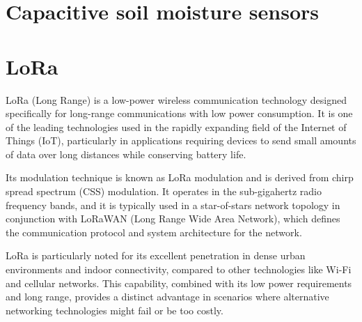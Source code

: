 \section{Capacitive soil moisture sensors}



\section{LoRa}
LoRa (Long Range) is a low-power wireless communication technology designed specifically for long-range communications with low power consumption. It is one of the leading technologies used in the rapidly expanding field of the Internet of Things (IoT), particularly in applications requiring devices to send small amounts of data over long distances while conserving battery life.

Its modulation technique is known as LoRa modulation and is derived from chirp spread spectrum (CSS) modulation. It operates in the sub-gigahertz radio frequency bands, and it is typically used in a star-of-stars network topology in conjunction with LoRaWAN (Long Range Wide Area Network), which defines the communication protocol and system architecture for the network.

LoRa is particularly noted for its excellent penetration in dense urban environments and indoor connectivity, compared to other technologies like Wi-Fi and cellular networks. This capability, combined with its low power requirements and long range, provides a distinct advantage in scenarios where alternative networking technologies might fail or be too costly.
